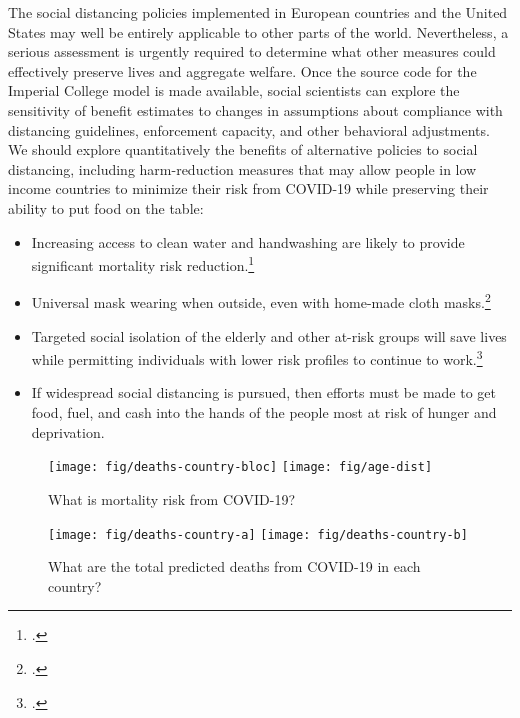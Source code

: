 \documentclass[11pt]{article}
\begin{document}
\begin{mdframed}
The social distancing policies implemented in European countries and the United States may well be entirely applicable to other parts of the world. Nevertheless, a serious assessment is urgently required to determine what other measures could effectively preserve lives and aggregate welfare. Once the source code for the Imperial College model is made available, social scientists can explore the sensitivity of benefit estimates to changes in assumptions about compliance with distancing guidelines, enforcement capacity, and other behavioral adjustments. We should explore quantitatively the benefits of alternative policies to social distancing, including harm-reduction measures that may allow people in low income countries to minimize their risk from COVID-19 while preserving their ability to put food on the table:

\begin{itemize}
    \item Increasing access to clean water and handwashing are likely to provide significant mortality risk reduction.\footcite{glassman2020}
    \item Universal mask wearing when outside, even with home-made cloth masks.\footcite{abaluck2020}
    \item Targeted social isolation of the elderly and other at-risk groups will save lives while permitting individuals with lower risk profiles to continue to work.\footcite{lshtm2020, favas2020}
    \item If widespread social distancing is pursued, then efforts must be made to get food, fuel, and cash into the hands of the people most at risk of hunger and deprivation.
\end{itemize}


\clearpage



\begin{figure}[htbp!]
  \centering
  \caption{What is mortality risk from COVID-19?}
  \texttt{[image: fig/deaths-country-bloc]}
    \texttt{[image: fig/age-dist]}
  \label{fig:perc-mortality}
\end{figure}

\begin{figure}[htbp!]
  \centering
  \caption{What are the total predicted deaths from COVID-19 in each country?}
  \texttt{[image: fig/deaths-country-a]}
  \texttt{[image: fig/deaths-country-b]}
  \label{fig:vsl-gdp}
\end{figure}



\end{mdframed}
\end{document}
